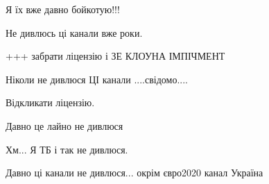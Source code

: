 \begin{itemize}
Я їх вже давно бойкотую!!!

 
Не дивлюсь ці канали вже роки.

 
+++ забрати ліцензію і ЗЕ КЛОУНА ІМПІЧМЕНТ

 
Ніколи не дивлюся ЦІ канали ....свідомо....

 
Відкликати ліцензію.

 
Давно це лайно не дивлюся

 
Хм... Я ТБ і так не дивлюся. \Laughey[1.0][white]

 
Давно ці канали не дивлюся... окрім євро2020 канал Україна

 

\end{itemize}
